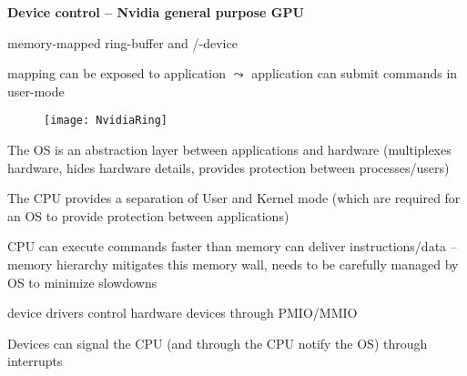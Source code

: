 \textbf{Device control -- Nvidia general purpose GPU}
\begin{items}
	\item memory-mapped ring-buffer and /-device
	\item mapping can be exposed to application \( \leadsto \) application can submit commands in user-mode
	\begin{figure}[H]\centering\label{NvidiaRing}\texttt{[image: NvidiaRing]}\end{figure}
\end{items}

\begin{summary}
	\begin{items}
		\setlength\itemsep{0em}
		\item The OS is an abstraction layer between applications and hardware (multiplexes hardware, hides hardware details, provides protection between processes/users)
		\item The CPU provides a separation of User and Kernel mode (which are required for an OS to provide protection between applications)
		\item CPU can execute commands faster than memory can deliver instructions/data -- memory hierarchy mitigates this memory wall, needs to be carefully managed by OS to minimize slowdowns
		\item device drivers control hardware devices through PMIO/MMIO
		\item Devices can signal the CPU (and through the CPU notify the OS) through interrupts
	\end{items}
\end{summary}
